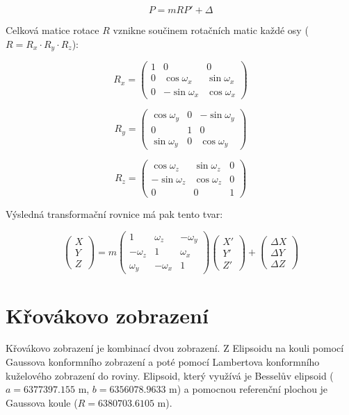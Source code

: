\documentclass[12pt, a4paper]{article}
\begin{document}
\[ P = m R P' + \Delta \]
\vspace{3mm}

\noindent Celková matice rotace $R$ vznikne součinem rotačních matic každé osy ($R = R_x \cdot R_y \cdot R_z$):

\[ R_x = \begin{pmatrix} 1 & 0 & 0 \\ 0 & \cos \omega_x & \sin \omega_x \\ 0 & -\sin \omega_x & \cos \omega_x \end{pmatrix} \]
\vspace{3mm}

\[ R_y = \begin{pmatrix} \cos \omega_y & 0 & -\sin \omega_y \\ 0 & 1 & 0 \\ \sin \omega_y & 0 & \cos \omega_y \end{pmatrix} \]
\vspace{3mm}

\[ R_z = \begin{pmatrix} \cos \omega_z & \sin \omega_z & 0 \\ -\sin \omega_z & \cos \omega_z & 0 \\ 0 & 0 & 1 \end{pmatrix} \]
\vspace{3mm}

\noindent Výsledná transformační rovnice má pak tento tvar:

\[ \begin{pmatrix} X \\ Y \\ Z \end{pmatrix} = m \begin{pmatrix} 1 & \omega_z & -\omega_y \\ -\omega_z & 1 & \omega_x \\ \omega_y & -\omega_x & 1 \end{pmatrix} \begin{pmatrix} X' \\ Y' \\ Z' \end{pmatrix} + \begin{pmatrix} \Delta X \\ \Delta Y \\ \Delta Z \end{pmatrix} \]

\newpage
\section*{Křovákovo zobrazení}
\vspace{5mm}
Křovákovo zobrazení je kombinací dvou zobrazení. Z Elipsoidu na kouli pomocí Gaussova konformního zobrazení a poté pomocí Lambertova konformního kuželového zobrazení do roviny. Elipsoid, který využívá je Besselův elipsoid ($a = 6377397.155$ m, $b = 6356078.9633$ m) a pomocnou referenční plochou je Gaussova koule ($R = 6380703.6105$ m).
\end{document}
